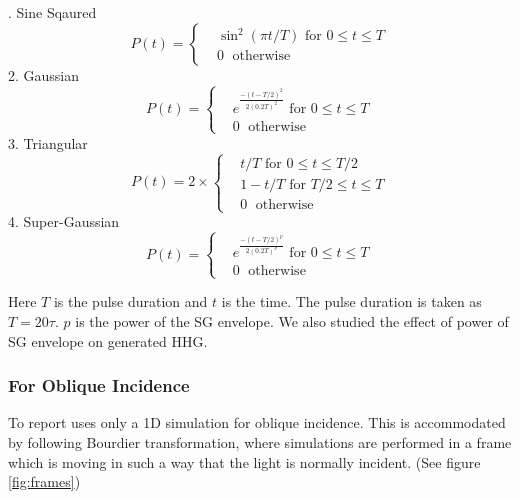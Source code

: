 . Sine Sqaured
\begin{equation}
    \label{eq:sin-sq-env}
    P(t)=
    \begin{cases}
         & \sin^2(\pi t/T) \text{ for } 0 \leq t \le T \\
         & 0         \;      \text{ otherwise }
    \end{cases}
\end{equation}
2. Gaussian
\begin{equation}
    \label{eq:gaussian-env}
    P(t)=
    \begin{cases}
         & e^{\frac{-(t-T/2)^2}{2(0.2T)^2}} \text{ for } 0 \leq t \le T \\
         & 0         \;      \text{ otherwise }
    \end{cases}
\end{equation}
3. Triangular
\begin{equation}
    \label{eq:triangle-env}
    P(t)= 2\times
    \begin{cases}
         & t/T \text{ for } 0 \leq t \le T/2    \\
         & 1-t/T \text{ for } T/2 \leq t \le T  \\
         & 0         \;      \text{ otherwise }
    \end{cases}
\end{equation}
4. Super-Gaussian
\begin{equation}
    \label{eq:sg-env}
    P(t)=
    \begin{cases}
         & e^{\frac{-(t-T/2)^p}{2(0.2T)^p}} \text{ for } 0 \leq t \le T \\
         & 0         \;      \text{ otherwise }
    \end{cases}
\end{equation}

Here $T$ is the pulse duration and $t$ is the time. The pulse duration is taken as $T = 20 \tau$. $p$ is the power of the SG envelope. We also studied the effect of power of SG envelope on generated HHG.

\subsubsection{For Oblique Incidence}
To report uses only a 1D simulation for oblique incidence. This is accommodated by following Bourdier transformation\cite{2d-transformation}, where simulations are performed in a frame which is moving in such a way that the light is normally incident. (See figure \ref{fig:frames})

